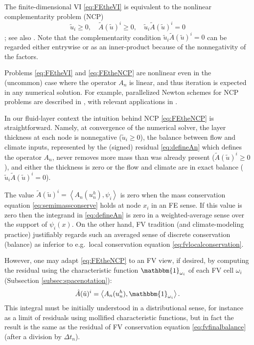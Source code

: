 \documentclass[final,onefignum]{siamart190516}
\newcommand{\ip}[2]{\ensuremath{\left<#1,#2\right>}}
\begin{document}
The finite-dimensional VI \eqref{eq:FEtheVI} is equivalent to the nonlinear complementarity problem (NCP)
\begin{equation}
\tilde u_i \ge 0, \quad \tilde A(\tilde u)^i \ge 0, \quad \tilde u_i \tilde A(\tilde u)^i = 0 \label{eq:FEtheNCP}
\end{equation}
\cite[Theorem I.5.5]{KinderlehrerStampacchia1980}; see also \cite{FacchineiPang2003}.  Note that the complementarity condition $\tilde u_i \tilde A(\tilde u)^i = 0$ can be regarded either entrywise or as an inner-product because of the nonnegativity of the factors.

Problems \eqref{eq:FEtheVI} and \eqref{eq:FEtheNCP} are nonlinear even in the (uncommon) case where the operator $A_n$ is linear, and thus iteration is expected in any numerical solution.  For example, parallelized Newton schemes for NCP problems are described in \cite{BensonMunson2006}, with relevant applications in \cite{Brinkerhoffetal2017,Bueler2016}.

In our fluid-layer context the intuition behind NCP \eqref{eq:FEtheNCP} is straightforward.  Namely, at convergence of the numerical solver, the layer thickness at each node is nonnegative ($\tilde u_i \ge 0$), the balance between flow and climate inputs, represented by the (signed) residual \eqref{eq:defineAn} which defines the operator $A_n$, never removes more mass than was already present ($\tilde A(\tilde u)^i \ge 0$), and either the thickness is zero or the flow and climate are in exact balance ($\tilde u_i \tilde A(\tilde u)^i = 0$).

The value $\tilde A(\tilde u)^i = \ip{A_n(u_n^h)}{\psi_i}$ is zero when the mass conservation equation \eqref{eq:semimassconserve} holds at node $x_i$ in an FE sense.  If this value is zero then the integrand in \eqref{eq:defineAn} is zero in a weighted-average sense over the support of $\psi_i(x)$.  On the other hand, FV tradition (and climate-modeling practice) justifiably regards such an averaged sense of discrete conservation (balance) as inferior to e.g.~local conservation equation \eqref{eq:fvlocalconservation}.

However, one may adapt \eqref{eq:FEtheNCP} to an FV view, if desired, by computing the residual using the characteristic function $\mathbbm{1}_{\omega_i}$ of each FV cell $\omega_i$ (Subsection \ref{subsec:spacenotation}):
\begin{equation}
\hat A(\tilde u)^i = \ip{A_n(u_n^h)}{\mathbbm{1}_{\omega_i}}. \label{eq:cellwiseresidual}
\end{equation}
This integral must be initially understood in a distributional sense, for instance as a limit of residuals using mollified characteristic functions, but in fact the result is the same as the residual of FV conservation equation \eqref{eq:fvfinalbalance} (after a division by $\Delta t_n$).
\end{document}
